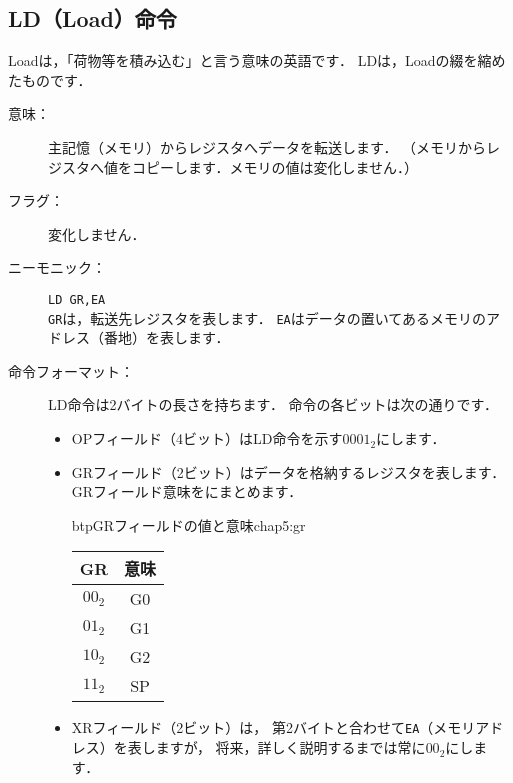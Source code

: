 \subsection{LD（Load）命令}
Loadは，「荷物等を積み込む」と言う意味の英語です．
LDは，Loadの綴を縮めたものです．

\begin{description}
\item[意味：]主記憶（メモリ）からレジスタへデータを転送します．
  （メモリからレジスタへ値をコピーします．メモリの値は変化しません．） 

\item[フラグ：]変化しません．

\item[ニーモニック：]\texttt{LD  GR,EA} \\
  \texttt{GR}は，転送先レジスタを表します．
  \texttt{EA}はデータの置いてあるメモリのアドレス（番地）を表します．

\item[命令フォーマット：]LD命令は2バイトの長さを持ちます．
  命令の各ビットは次の通りです．


  \begin{itemize}
  \item OPフィールド（4ビット）はLD命令を示す$0001_2$にします．
  \item GRフィールド（2ビット）はデータを格納するレジスタを表します．
    GRフィールド意味をにまとめます．

    \begin{mytable}{btp}{GRフィールドの値と意味}{chap5:gr}
      {\small\begin{center}
        \begin{tabular}{c|c} \hline\hline
          GR & 意味 \\
          \hline
          $00_2$ & G0 \\
          $01_2$ & G1 \\
          $10_2$ & G2 \\
          $11_2$ & SP \\
        \end{tabular}
      \end{center}}
    \end{mytable}

  \item XRフィールド（2ビット）は，
    第2バイトと合わせて\texttt{EA}（メモリアドレス）を表しますが，
    将来，詳しく説明するまでは常に$00_2$にします．


\end{itemize}
\end{description}

